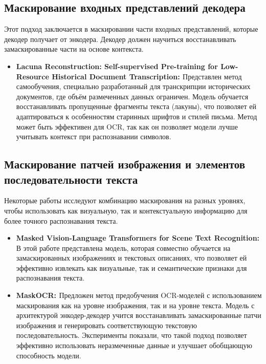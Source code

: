 \subsection{Маскирование входных представлений декодера}
Этот  подход  заключается  в  маскировании  части  входных  представлений,  которые  декодер  получает  от  энкодера.  Декодер  должен  научиться  восстанавливать  замаскированные  части  на  основе  контекста.
\begin{itemize}
    \item  \textbf{Lacuna Reconstruction: Self-supervised Pre-training for Low-Resource Historical Document Transcription: \cite{stammer2023lacuna}} Представлен  метод  самообучения,  специально  разработанный  для  транскрипции  исторических  документов,  где  объём  размеченных  данных  ограничен.  Модель  обучается  восстанавливать  пропущенные  фрагменты  текста  (лакуны),  что  позволяет  ей  адаптироваться  к  особенностям  старинных  шрифтов  и  стилей  письма.
    Метод  может  быть  эффективен  для  OCR,  так  как  он  позволяет  модели  лучше  учитывать  контекст  при  распознавании  символов.
\end{itemize}

\subsection{Маскирование  патчей  изображения  и  элементов  последовательности  текста}  Некоторые  работы  исследуют  комбинацию  маскирования  на  разных  уровнях,  чтобы  использовать  как  визуальную,  так  и  контекстуальную  информацию  для  более  точного  распознавания  текста. 
\begin{itemize}
    \item \textbf{Masked Vision-Language Transformers for Scene Text Recognition: \cite{lyons2022masked}}  В  этой  работе представлена  модель,  которая  совместно  обучается  на  замаскированных  изображениях  и  текстовых  описаниях,  что  позволяет  ей  эффективно  извлекать  как  визуальные,  так  и  семантические  признаки  для  распознавания  текста.
    \item \textbf{MaskOCR: \cite{li2022maskocr}}  Предложен  метод  предобучения  OCR-моделей  с  использованием  маскирования  как  на  уровне  изображения,  так  и  на  уровне  текста.  Модель  с  архитектурой  энкодер-декодер  учится  восстанавливать  замаскированные  патчи  изображения  и  генерировать  соответствующую  текстовую  последовательность.  Эксперименты  показали,  что  такой  подход  позволяет  эффективно  использовать  неразмеченные  данные  и  улучшает  обобщающую  способность  модели.
\end{itemize}


